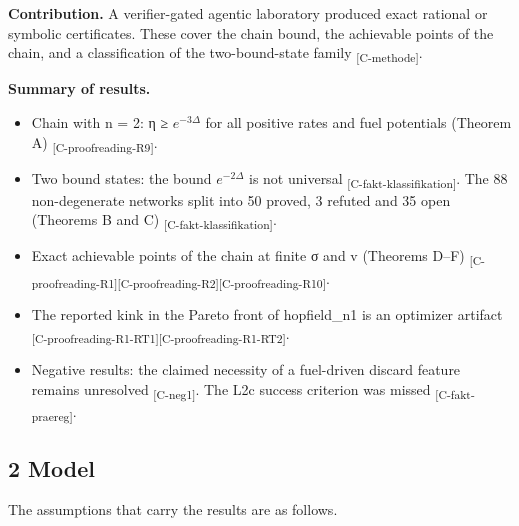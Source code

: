 \documentclass[
  english,
  twocolumn,
  10pt]{article}
\providecommand{\tightlist}{%
  \setlength{\itemsep}{0pt}\setlength{\parskip}{0pt}}
\begin{document}
\textbf{Contribution.} A verifier-gated agentic laboratory produced
exact rational or symbolic certificates. These cover the chain bound,
the achievable points of the chain, and a classification of the
two-bound-state family \textsubscript{[C-methode]}.

\textbf{Summary of results.}

\begin{itemize}
\tightlist
\item
  Chain with n = 2: η ≥ \(e^{-3\Delta}\) for all positive rates and fuel
  potentials (Theorem A) \textsubscript{[C-proofreading-R9]}.
\item
  Two bound states: the bound \(e^{-2\Delta}\) is not universal
  \textsubscript{[C-fakt-klassifikation]}. The 88 non-degenerate
  networks split into 50 proved, 3 refuted and 35 open (Theorems B and
  C) \textsubscript{[C-fakt-klassifikation]}.
\item
  Exact achievable points of the chain at finite σ and v (Theorems D--F)
  \textsubscript{[C-proofreading-R1]}\textsubscript{[C-proofreading-R2]}\textsubscript{[C-proofreading-R10]}.
\item
  The reported kink in the Pareto front of hopfield\_n1 is an optimizer
  artifact
  \textsubscript{[C-proofreading-R1-RT1]}\textsubscript{[C-proofreading-R1-RT2]}.
\item
  Negative results: the claimed necessity of a fuel-driven discard
  feature remains unresolved \textsubscript{[C-neg1]}. The L2c success
  criterion was missed \textsubscript{[C-fakt-praereg]}.
\end{itemize}

\subsection{2 Model}\label{model}

The assumptions that carry the results are as follows.
\end{document}

